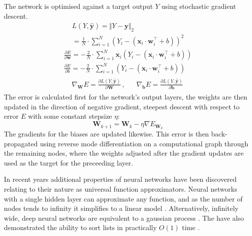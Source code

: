 The network is optimised against a target output $Y$ using stochastic gradient descent.
\begin{equation}
    \begin{gathered}
        L(Y, \mathbf{\hat{y}}) = \Vert Y - \mathbf{\hat{y}} \Vert_{2} \\
        = \frac{1}{N} \cdot \sum_{i=1}^{N} (Y_i - (\mathbf{x}_i \cdot \mathbf{w}_i^\top + b))^2
    \end{gathered}
\end{equation}
\begin{equation}
    \begin{gathered}
        \frac{\partial E}{\partial \mathbf{w}} = -\frac{2}{N} \cdot \sum_{i=1}^{N} \mathbf{x}_i(Y_i-(\mathbf{x}_i \cdot \mathbf{w}_i^\top +b)) \\
    \frac{\partial E}{\partial b} = -\frac{2}{N} \cdot \sum_{i=1}^{N} (Y_i-(\mathbf{x}_i \cdot \mathbf{w}_i^\top +b))
    \end{gathered}
\end{equation}
\begin{gather}
    \begin{aligned}
        \nabla_{\mathbf{W}} E = \frac{\partial L(Y, \mathbf{\hat{y}}) }{\partial \mathbf{W}}  \,, \;\;\; &
        \nabla_{\mathbf{b}} E = \frac{\partial L(Y, \mathbf{\hat{y}})}{\partial \mathbf{b}} \,
    \end{aligned} 
\end{gather}
The error is calculated first for the network's output layers, the weights are then updated in the direction of 
negative gradient, steepest descent with respect to error $E$ with some constant stepsize $\eta$:
\begin{equation}
    \mathbf{W}_{k+1}=\mathbf{W}_{k} - \eta \nabla E_{\mathbf{W}_k}
\end{equation}
The gradients for the biases are updated likewise. This error is then back-propagated
using reverse mode differentiation on a computational graph \cite{Margossian2019} through the remaining nodes,
where the weights adjusted after the gradient updates are used as the target for the preceeding layer.
\begin{remark}
    In recent years additional properties of neural networks have been discovered
    relating to their nature as universal function approximators. Neural networks with
    a single hidden layer can approximate any function, and as the number
    of nodes tends to infinity it simplifies to a linear model \cite{Jaehoon2019}. Alternatively, infinitely
    wide, deep neural networks are equivalent to a gaussian process \cite{Jaehoon2017}.
    The have also demonstrated the ability to sort lists in practically $O(1)$ time \cite{Xiaoke2019}.
\end{remark}
